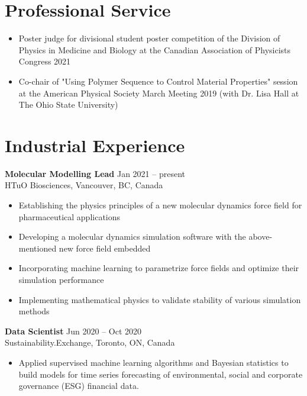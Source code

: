 \documentclass[11pt]{../yhlcv}
\begin{document}
\section*{Professional Service}
\begin{itemize}[leftmargin=*]\itemsep-0.2em
\item Poster judge for divisional student poster competition of the Division of Physics in Medicine and Biology at the Canadian Association of Physicists Congress 2021

\item Co-chair of "Using Polymer Sequence to Control Material Properties" session at the American Physical Society March Meeting 2019 (with Dr. Lisa Hall at The Ohio State University)
\end{itemize}


\section*{Industrial Experience}

{\bf Molecular Modelling Lead}  \hfill Jan 2021 -- present \vspace{0.25em} \\
HTuO Biosciences, Vancouver, BC, Canada 
\vspace{-0.7em} \\
\begin{itemize}[leftmargin=*]\itemsep-0.2em
\item Establishing the physics principles of a new molecular dynamics force field for pharmaceutical applications
\item Developing a molecular dynamics simulation software with the above-mentioned new force field embedded
\item Incorporating machine learning to parametrize force fields and optimize their simulation performance
\item Implementing mathematical physics to validate stability of various simulation methods
\end{itemize}

{\bf Data Scientist} \hfill Jun 2020 -- Oct 2020 \vspace{0.25em} \\
Sustainability.Exchange, Toronto, ON, Canada
\vspace{-0.7em}\\
\begin{itemize}[leftmargin=*]\itemsep-0.2em
\item Applied supervised machine learning algorithms and Bayesian statistics to build models for time series
forecasting of environmental, social and corporate governance (ESG) financial data.
\end{itemize}
\end{document}
